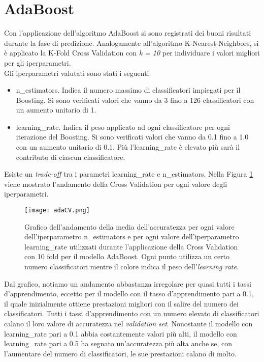 \section{AdaBoost}
Con l'applicazione dell'algoritmo AdaBoost si sono registrati dei buoni risultati durante la fase di predizione. Analogamente all'algoritmo K-Nearest-Neighbors, si è applicato la K-Fold Cross Validation con \emph{k = 10} per individuare i valori migliori per gli iperparametri.\\
Gli iperparametri valutati sono stati i seguenti:
\begin{itemize}
	\item \textsf{n\_estimators}. Indica il numero massimo di classificatori impiegati per il Boosting. Si sono verificati valori che vanno da 3 fino a 126 classificatori con un aumento unitario di 1.
	\item \textsf{learning\_rate}. Indica il peso applicato ad ogni classificatore per ogni iterazione del Boosting. Si sono verificati valori che vanno da 0.1 fino a 1.0 con un aumento unitario di 0.1. Più l'\textsf{learning\_rate} è elevato più sarà il contributo di ciascun classificatore.
\end{itemize}
Esiste un \emph{trade-off} tra i parametri \textsf{learning\_rate} e \textsf{n\_estimators}. Nella Figura \ref{fig:adaCV} viene mostrato l'andamento della Cross Validation per ogni valore degli iperparametri.
\begin{figure}[h]
	\begin{center}
		\texttt{[image: adaCV.png]}
		\caption{Grafico dell'andamento della media dell'accuratezza per ogni valore dell'iperparametro \textsf{n\_estimators} e per ogni valore dell'iperparametro \textsf{learning\_rate} utilizzati durante l'applicazione della Cross Validation con 10 fold per il modello AdaBoost. Ogni punto utilizza un certo numero classificatori mentre il colore indica il peso dell'\emph{learning rate}.
		} 
		\label{fig:adaCV}
	\end{center}
\end{figure}
Dal grafico, notiamo un andamento abbastanza irregolare per quasi tutti i tassi d'apprendimento, eccetto per il modello con il tasso d'apprendimento pari a 0.1, il quale inizialmente ottiene prestazioni migliori con il salire del numero dei classificatori. Tutti i tassi d'apprendimento con un numero elevato di classificatori calano il loro valore di accuratezza nel \emph{validation set}. Nonostante il modello con \textsf{learning\_rate} pari a 0.1 abbia costantemente valori più alti, il modello con \textsf{learning\_rate} pari a 0.5 ha segnato un'accuratezza più alta anche se, con l'aumentare del numero di classificatori, le sue prestazioni calano di molto. \\
